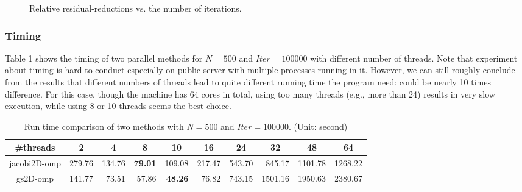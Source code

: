 \documentclass[11pt, oneside]{article}   	%
\begin{document}
\begin{figure}[ht]
\caption{Relative residual-reductions vs. the number of iterations.}
\end{figure}
\subsubsection{Timing}
Table 1 shows the timing of two parallel methods for $N=500$ and $Iter= 100000$ with different number of threads. Note that experiment about timing is hard to conduct especially on public server with multiple processes running in it. However, we can still roughly conclude from the results that different numbers of threads lead to quite different running time the program need: could be nearly 10 times difference. For this case, though the machine has 64 cores in total, using too many threads (e.g., more than 24) results in very slow execution, while using 8 or 10 threads seems the best choice.
\begin{table}[ht]
\centering
\caption{Run time comparison of two methods with $N=500$ and $Iter= 100000$. (Unit: second)}
\begin{tabular}{|c|r|r|r|r|r|r|r|r|r|}
\hline
\#threads             & \multicolumn{1}{c|}{2} & \multicolumn{1}{c|}{4} & \multicolumn{1}{c|}{8} & \multicolumn{1}{c|}{10} & \multicolumn{1}{c|}{16} & \multicolumn{1}{c|}{24} & \multicolumn{1}{c|}{32} & \multicolumn{1}{c|}{48} & \multicolumn{1}{c|}{64} \\ \hline
jacobi2D-omp  & 279.76  & 134.76  & {\bf 79.01}  & 109.08   & 217.47   & 543.70   & 845.17   &  1101.78  & 1268.22   \\ \hline
gs2D-omp      &  141.77 & 73.51  & 57.86  &  {\bf 48.26} & 76.82   & 743.15   &  1501.16  &  1950.63  &  2380.67  \\ \hline
\end{tabular}
\end{table}
\end{document}

